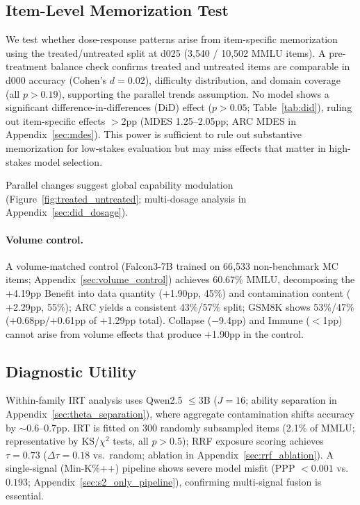 \subsection{Item-Level Memorization Test}
\label{sec:memorization_test}

We test whether dose-response patterns arise from item-specific memorization using the treated/untreated split at d025 (3{,}540 / 10{,}502 MMLU items). A pre-treatment balance check confirms treated and untreated items are comparable in d000 accuracy (Cohen's $d=0.02$), difficulty distribution, and domain coverage (all $p>0.19$), supporting the parallel trends assumption. No model shows a significant difference-in-differences (DiD) effect ($p > 0.05$; Table~\ref{tab:did}), ruling out item-specific effects $>$2pp (MDES 1.25--2.05pp; ARC MDES in Appendix~\ref{sec:mdes}). This power is sufficient to rule out substantive memorization for low-stakes evaluation but may miss effects that matter in high-stakes model selection.

Parallel changes suggest global capability modulation (Figure~\ref{fig:treated_untreated}; multi-dosage analysis in Appendix~\ref{sec:did_dosage}).

\paragraph{Volume control.}
A volume-matched control (Falcon3-7B trained on 66{,}533 non-benchmark MC items; Appendix~\ref{sec:volume_control}) achieves 60.67\% MMLU, decomposing the $+$4.19pp Benefit into data quantity ($+$1.90pp, 45\%) and contamination content ($+$2.29pp, 55\%); ARC yields a consistent 43\%/57\% split; GSM8K shows 53\%/47\% ($+$0.68pp/$+$0.61pp of $+$1.29pp total). Collapse ($-$9.4pp) and Immune ($<$1pp) cannot arise from volume effects that produce $+$1.90pp in the control.

\subsection{Diagnostic Utility}
\label{sec:calibration_results}

Within-family IRT analysis uses Qwen2.5 $\leq$3B ($J=16$; ability separation in Appendix~\ref{sec:theta_separation}), where aggregate contamination shifts accuracy by ${\sim}$0.6--0.7pp. IRT is fitted on 300 randomly subsampled items (2.1\% of MMLU; representative by KS/$\chi^2$ tests, all $p > 0.5$); RRF exposure scoring achieves $\tau = 0.73$ ($\Delta\tau = 0.18$ vs.\ random; ablation in Appendix~\ref{sec:rrf_ablation}). A single-signal (Min-K\%++) pipeline shows severe model misfit (PPP $< 0.001$ vs.\ $0.193$; Appendix~\ref{sec:s2_only_pipeline}), confirming multi-signal fusion is essential.

